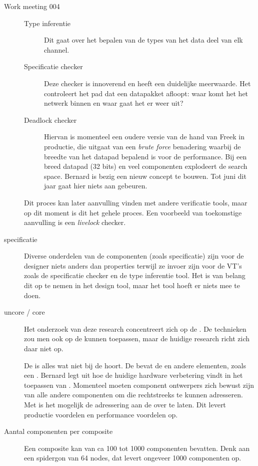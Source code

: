 \documentclass[a4paper,final]{article}
\begin{document}
\begin{Minutes}{Work meeting 004}
\begin{description}
\begin{description}
		\item[Type inferentie] Dit gaat over het bepalen van de types van het data
		deel van elk channel.
		
		\item[Specificatie checker] Deze checker is innoverend en heeft een duidelijke 
		meerwaarde. Het controleert het pad dat een datapakket afloopt: waar komt het het 
		netwerk binnen en waar gaat het er weer uit?
		
		\item[Deadlock checker] Hiervan is momenteel een oudere versie van de hand van Freek
		in productie, die uitgaat van een \textit{brute force} benadering waarbij de breedte van 
		het datapad bepalend is voor de performance. Bij een breed datapad (32 bits) en veel 
		componenten explodeert de search space. Bernard is bezig een nieuw concept te bouwen.
		Tot juni dit jaar gaat hier niets aan gebeuren.
		
	\end{description}
	
	Dit proces kan later aanvulling vinden met andere verificatie tools, maar op dit moment
	is dit het gehele proces. Een voorbeeld van toekomstige aanvulling is een \textit{livelock} 
	checker. 
	
	\item[specificatie] Diverse onderdelen van de componenten (zoals specificatie) zijn voor
	de designer niets anders dan properties terwijl ze invoer zijn voor de VT's zoals de 
	specificatie checker en de type inferentie tool. Het is van belang dit op te nemen in
	het design tool, maar het tool hoeft er niets mee te doen.
	
	\item[uncore / core] Het onderzoek van deze research concentreert zich op de . 
	De technieken zou men ook op de  kunnen toepassen, maar de huidige research richt 
	zich daar niet op.
	
	De  is alles wat niet bij de  hoort. De  bevat de  
	en andere elementen, zoals een . Bernard legt uit hoe de huidige hardware 
	verbetering vindt in het toepassen van . Momenteel moeten component ontwerpers 
	zich bewust zijn van alle andere componenten om die rechtstreeks te kunnen adresseren. 
	Met  is het mogelijk de adressering aan de  over te laten. Dit 
	levert productie voordelen en performance voordelen op.
	
	\item[Aantal componenten per composite] Een composite kan van ca 100 tot 1000 
	componenten bevatten.  Denk aan een spidergon van 64 nodes, dat levert 
	ongeveer 1000 componenten op.
	

\end{description}
\end{Minutes}
\end{document}
